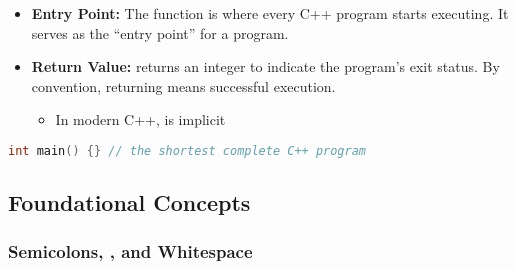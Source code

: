 \documentclass{article}
\begin{document}
\subsubsection{}

\begin{itemize}
	\item \textbf{Entry Point:} The  function is where every C++ program starts executing. It serves as the ``entry point'' for a program.
	\item \textbf{Return Value:}  returns an integer to indicate the program's exit status. By convention, returning  means successful execution.
	\begin{itemize}
		\item In modern C++,  is implicit
	\end{itemize}
\end{itemize}

\begin{lstlisting}[language=C++]
int main() {} // the shortest complete C++ program
\end{lstlisting}

\subsection{Foundational Concepts}

\subsubsection{Semicolons, , and Whitespace}
\end{document}
